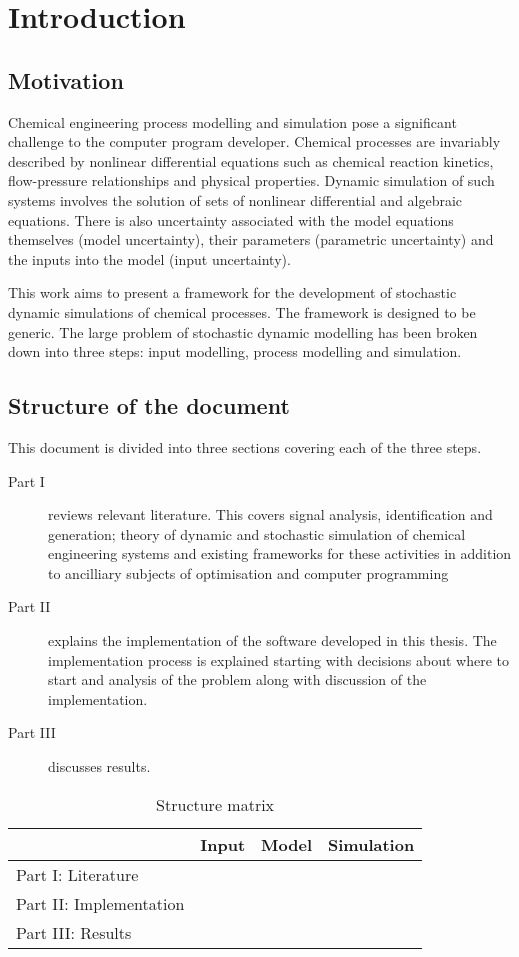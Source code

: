 \chapter{Introduction}\label{chap:intro}

\section{Motivation}
Chemical engineering process modelling and simulation pose a significant challenge to the computer program developer.  
Chemical processes are invariably described by nonlinear differential equations
such as chemical reaction kinetics, flow-pressure relationships and
physical properties.  
Dynamic simulation of such systems involves the solution of sets of nonlinear differential and algebraic equations.
There is also uncertainty associated with the model equations themselves (model uncertainty), their parameters (parametric uncertainty) and the inputs into the model (input uncertainty).

This work aims to present a framework for the development of stochastic dynamic simulations of chemical processes. 
The framework is designed to be generic. 
The large problem of stochastic dynamic modelling has been broken down into three steps: input modelling, process modelling and simulation.

\section{Structure of the document}
This document is divided into three sections covering each of the three steps.
\begin{description}
\item[Part I] reviews relevant literature.  
	This covers signal analysis, identification and generation; theory of dynamic and stochastic simulation of chemical engineering systems and existing frameworks for these activities in addition to ancilliary subjects of optimisation and computer programming
\item[Part II] explains the implementation of the software developed in this thesis.  The implementation process is explained starting with decisions about where to start and analysis of the problem along with discussion of the implementation.
\item[Part III] discusses results.  
\end{description}

\begin{table}[htbp]
  \centering
  \begin{tabular}{llll}
    \toprule
                            & Input & Model & Simulation \\
    \midrule
    Part I: Literature      &       &       &            \\
    Part II: Implementation &       &       &            \\
    Part III: Results       &       &       &            \\
    \bottomrule
  \end{tabular}
  \caption{Structure matrix}
  \label{tab:structure}
\end{table}

